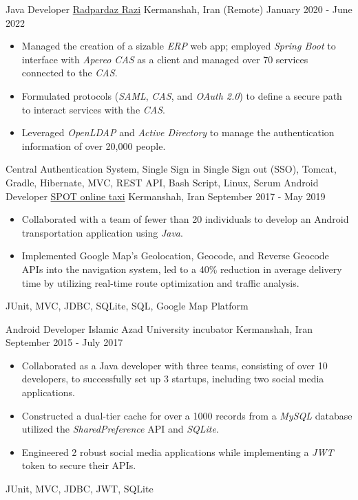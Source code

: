 \begin{experiences}
  \emptySeparator 
\experience
{}
{Java Developer}
{\href{https://raadpardaz.ir/}{Radpardaz Razi}}
{Kermanshah, Iran {\scriptsize{(Remote)}} \hspace{148 pt} January 2020 - June 2022}
{}
{
\begin{itemize}
\item Managed the creation of a sizable \emph{ERP} web app; employed \emph{Spring Boot} to interface with \emph{Apereo CAS} as a client and managed over 70 services connected to the \emph{CAS}.
\item Formulated protocols (\emph{SAML}, \emph{CAS}, and \emph{OAuth 2.0}) to define a secure path to interact services with the \textit{CAS}.
\item Leveraged \emph{OpenLDAP} and \emph{Active Directory} to manage the authentication information of over 20,000 people.
\end{itemize}
}{Central Authentication System, Single Sign in Single Sign out (SSO), Tomcat, Gradle, Hibernate, MVC, REST API, Bash Script, Linux, Scrum}
\emptySeparator
\experience
  {}
  {Android Developer}
  {\href{https://www.spotbar.ir/}{SPOT online taxi}}
  {Kermanshah, Iran \hspace{144 pt} September 2017 - May 2019}
  {}
  {
  \begin{itemize}
    \item Collaborated with a team of fewer than 20 individuals to develop an Android transportation application using \emph{Java}.
    \item Implemented Google Map's Geolocation, Geocode, and Reverse Geocode APIs into the navigation system, led to a 40\% reduction in average delivery time by utilizing real-time route optimization and traffic analysis. \end{itemize}
  }{JUnit, MVC, JDBC, SQLite, SQL, Google Map Platform}

\emptySeparator

\experience
{}
{Android Developer}
{Islamic Azad University incubator}
{Kermanshah, Iran \hspace{72 pt} September 2015 - July 2017}
{}
{
\begin{itemize}
  \item Collaborated as a Java developer with three teams, consisting of over 10 developers, to successfully set up 3 startups, including two social media applications.
\item Constructed a dual-tier cache for over a 1000 records from a \emph{MySQL} database utilized the \emph{SharedPreference} API and \emph{SQLite}.
\item Engineered 2 robust social media applications while implementing a \emph{JWT} token to secure their APIs.
\end{itemize}
}{JUnit, MVC, JDBC, JWT, SQLite}
\end{experiences}